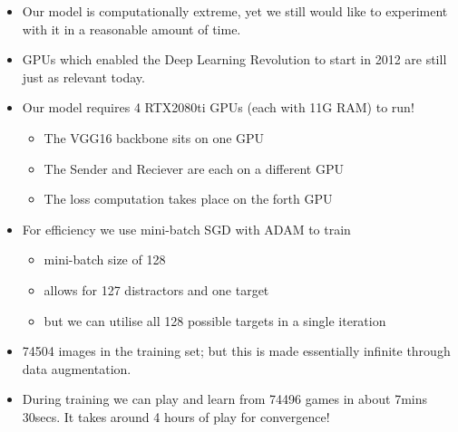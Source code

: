 \documentclass[\beamerclass,aspectratio=1610]{beamer}
\begin{document}
\begin{frame}
\begin{columns}

\begin{itemize}
	\item<1> Our model is computationally extreme, yet we still would like to experiment with it in a reasonable amount of time.
	\item<1> GPUs which enabled the Deep Learning Revolution to start in 2012 are still just as relevant today.
	\item<2> Our model requires 4 RTX2080ti GPUs (each with 11G RAM) to run!
	\begin{itemize}
		\item The VGG16 backbone sits on one GPU
		\item The Sender and Reciever are each on a different GPU
		\item The loss computation takes place on the forth GPU
	\end{itemize}
	\item<2> For efficiency we use mini-batch SGD with ADAM to train
	\begin{itemize}
		\item mini-batch size of 128
		\item allows for 127 distractors and one target
		\item but we can utilise all 128 possible targets in a single iteration
	\end{itemize}
	\item<3> 74504 images in the training set; but this is made essentially infinite through data augmentation.
	\item<3> During training we can play and learn from 74496 games in about 7mins 30secs. It takes around 4 hours of play for convergence!
\end{itemize}	
\end{columns}
\end{frame}
\end{document}
